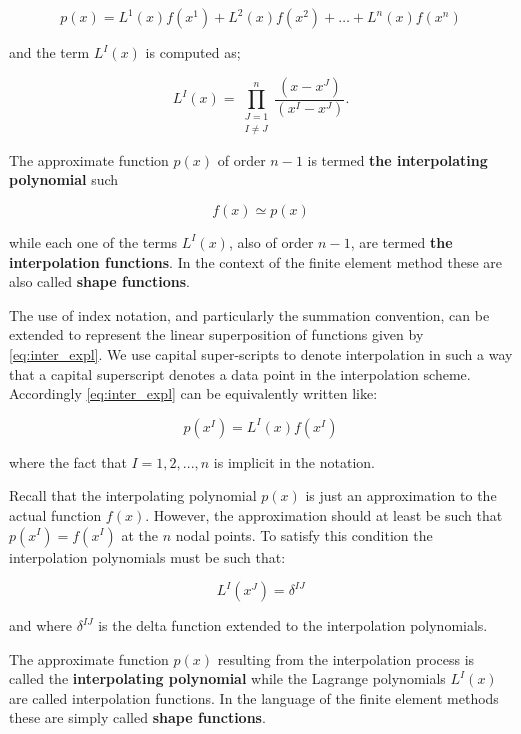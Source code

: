 \begin{equation}\label{eq:inter_expl}
p(x) = {L^1}(x)f({x^1}) + {L^2}(x)f({x^2}) +  \ldots  + {L^n}(x)f({x^n})
\end{equation}

and the term ${L^I}(x)$ is computed as;

\begin{equation}\label{eq:coef}
  L^I(x) = \prod_{\substack{J = 1\\ I \ne J}}^n \frac{(x - x^J)}{(x^I - x^J)}.
\end{equation}

The approximate function $p(x)$ of order $n-1$ is termed {\bf the interpolating polynomial} such


\[f(x)\simeq p(x)\]


while each one of the terms ${L^I}(x)$, also of order $n-1$, are termed {\bf the interpolation functions}. In the context of the finite element method these are also called {\bf shape functions}.

The use of index notation, and particularly the summation convention, can be extended to represent the linear superposition of functions given by \cref{eq:inter_expl}. We use capital super-scripts to denote interpolation in such a way that a capital superscript denotes a data point in the interpolation scheme. Accordingly \cref{eq:inter_expl} can be equivalently written like:


\begin{equation}\label{eq:pol}
  p(x^I) = L^I(x) f(x^I)  
\end{equation}

where the fact that $I=1,2,...,n$ is implicit in the notation.

Recall that the interpolating polynomial $p(x)$ is just an approximation to the actual function $f(x)$. However, the approximation should at least be such that $p(x^I) = f(x^I)$ at the $n$ nodal points. To satisfy this condition the interpolation polynomials must be such that:

\[L^I(x^J) = \delta^{IJ}\]

and where ${\delta ^{IJ}}$ is the delta function extended to the interpolation polynomials.

\begin{tcolorbox}
The approximate function $p(x)$ resulting from the interpolation process is called the {\bf interpolating polynomial} while the Lagrange polynomials $L^I(x)$ are called interpolation functions. In the language of the finite element methods these are simply called {\bf shape functions}. 
\end{tcolorbox}


